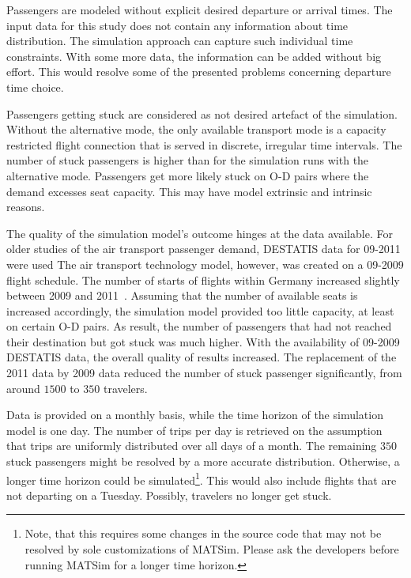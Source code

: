 Passengers are modeled without explicit desired departure or arrival times. 
The input data for this study does not contain any information about time distribution. 
The simulation approach can capture such individual time constraints.  
With some more data, the information can be added without big effort. 
This would resolve some of the presented problems concerning departure time choice. 

%
Passengers getting stuck are considered as not desired artefact of the simulation. 
Without the alternative mode, the only available transport mode is a capacity restricted flight connection that is served in discrete, irregular time intervals. 
The number of stuck passengers is higher than for the simulation runs with the alternative mode. 
Passengers get more likely stuck on O-D pairs where the demand excesses seat capacity. 
This may have model extrinsic and intrinsic reasons. 

The quality of the simulation model's outcome hinges at the data available.  
For older studies of the air transport passenger demand, DESTATIS data for 09-2011 were used
The air transport technology model, however, was created on a 09-2009 flight schedule.  
The number of starts of flights within Germany increased slightly between 2009 and 2011~\citep[][p.~23]{DLR2011Luftverkehrsbericht}. 
Assuming that the number of available seats is increased accordingly, the simulation model provided too little capacity, at least on certain O-D pairs. 
As result, the number of passengers that had not reached their destination but got stuck was much higher. 
With the availability of 09-2009 DESTATIS data, the overall quality of results increased.  
The replacement of the 2011 data by 2009 data reduced the number of stuck passenger significantly, from around $1500$ to $350$ travelers. 

Data is provided on a monthly basis, while the time horizon of the simulation model is one day. 
The number of trips per day is retrieved on the assumption that trips are uniformly distributed over all days of a month.  
The remaining $350$ stuck passengers might be resolved by a more accurate distribution. 
Otherwise, a longer time horizon could be simulated\footnote{Note, that this requires some changes in the source code that may not be resolved by sole customizations of MATSim. Please ask the developers before running MATSim for a longer time horizon.}. 
This would also include flights that are not departing on a Tuesday. 
Possibly, travelers no longer get stuck. 

